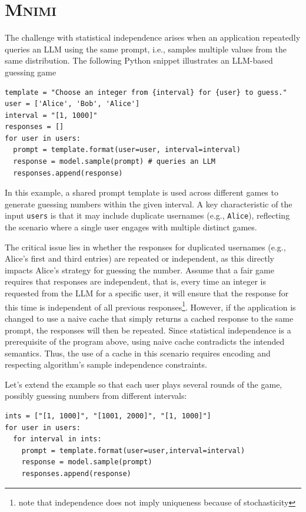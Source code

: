 \documentclass[sigconf]{acmart}
\newcommand{\projName}{\textsc{Mnimi}\xspace}
\begin{document}
\section{\projName}

The challenge with statistical independence arises when an application repeatedly queries an LLM using the same prompt, i.e., samples multiple values from the same distribution. The following Python snippet illustrates an LLM-based guessing game
\begin{lstlisting}
template = "Choose an integer from {interval} for {user} to guess."
user = ['Alice', 'Bob', 'Alice']
interval = "[1, 1000]"
responses = []
for user in users:
  prompt = template.format(user=user, interval=interval)
  response = model.sample(prompt) # queries an LLM
  responses.append(response)
\end{lstlisting}
In this example, a shared prompt template is used across different games to generate guessing numbers within the given interval. A key characteristic of the input \texttt{users} is that it may include duplicate usernames (e.g.,  \texttt{\textquotesingle Alice\textquotesingle}), reflecting the scenario where a single user engages with multiple distinct games. 


The critical issue lies in whether the responses for duplicated usernames (e.g., Alice's first and third entries) are repeated or independent, as this directly impacts Alice's strategy for guessing the number. Assume that a fair game requires that responses are independent, that is, every time an integer is requested from the LLM for a specific user, it will ensure that the response for this time is independent of all previous responses\footnote{note that independence does not imply uniqueness because of stochasticity}. However, if the application is changed to use a naive cache that simply returns a cached response to the same prompt, the responses will then be repeated. Since statistical independence is a prerequisite of the program above, using naive cache contradicts the intended semantics. Thus, the use of a cache in this scenario requires encoding and respecting algorithm's sample independence constraints.

Let's extend the example so that each user plays several rounds of the game, possibly guessing numbers from different intervals:

\begin{lstlisting}
ints = ["[1, 1000]", "[1001, 2000]", "[1, 1000]"]
for user in users:
  for interval in ints:
    prompt = template.format(user=user,interval=interval)
    response = model.sample(prompt)
    responses.append(response) 
\end{lstlisting}
\end{document}
